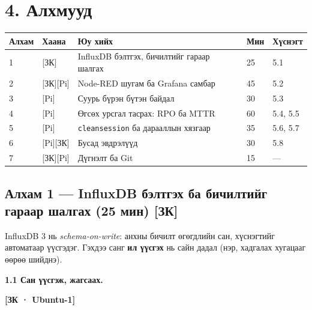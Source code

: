 \hypertarget{ux430ux43bux445ux43cux443ux443ux434}{%
\section{4. Алхмууд}\label{ux430ux43bux445ux43cux443ux443ux434}}

\begingroup\scriptsize\begin{longtable}[]{@{}lllll@{}}
\toprule
Алхам & Хаана & Юу хийх & Мин & Хүснэгт\tabularnewline
\midrule
\endhead
1 & {[}ЗК{]} & InfluxDB бэлтгэх, бичилтийг гараар шалгах & 25 & 5.1\tabularnewline
2 & {[}ЗК{]}{[}Pi{]} & Node-RED шугам ба Grafana самбар & 45 & 5.2\tabularnewline
3 & {[}Pi{]} & Суурь бүрэн бүтэн байдал & 30 & 5.3\tabularnewline
4 & {[}Pi{]} & Өгсөх урсгал тасрах: RPO ба MTTR & 60 & 5.4, 5.5\tabularnewline
5 & {[}Pi{]} & \texttt{cleansession} ба дарааллын хязгаар & 35 & 5.6, 5.7\tabularnewline
6 & {[}Pi{]}{[}ЗК{]} & Бусад эвдрэлүүд & 30 & 5.8\tabularnewline
7 & {[}ЗК{]}{[}Pi{]} & Дүгнэлт ба Git & 15 & ---\tabularnewline
\bottomrule
\end{longtable}\endgroup

\hypertarget{ux430ux43bux445ux430ux43c-1-influxdb-ux431ux44dux43bux442ux433ux44dux445-ux431ux430-ux431ux438ux447ux438ux43bux442ux438ux439ux433-ux433ux430ux440ux430ux430ux440-ux448ux430ux43bux433ux430ux445-25-ux43cux438ux43d-ux437ux43a}{%
\subsection{Алхам 1 --- InfluxDB бэлтгэх ба бичилтийг гараар шалгах (25 мин) {[}ЗК{]}}\label{ux430ux43bux445ux430ux43c-1-influxdb-ux431ux44dux43bux442ux433ux44dux445-ux431ux430-ux431ux438ux447ux438ux43bux442ux438ux439ux433-ux433ux430ux440ux430ux430ux440-ux448ux430ux43bux433ux430ux445-25-ux43cux438ux43d-ux437ux43a}}

InfluxDB 3 нь \emph{schema-on-write}: анхны бичилт өгөгдлийн сан, хүснэгтийг автоматаар үүсгэдэг. Гэхдээ санг \textbf{ил үүсгэх} нь сайн дадал (нэр, хадгалах хугацааг өөрөө шийднэ).

\textbf{1.1 Сан үүсгэж, жагсаах.}

\textbf{{[}ЗК · Ubuntu-1{]}}

\begin{Shaded}
\begin{Highlighting}[]
 \KeywordTok{\textbackslash{}}
   
 \KeywordTok{|} 
\end{Highlighting}
\end{Shaded}

